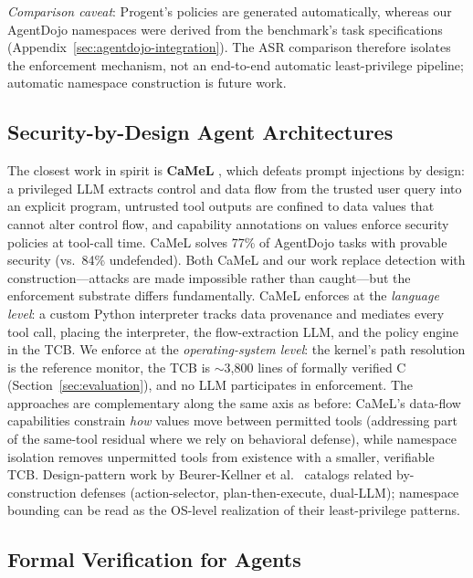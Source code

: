 \documentclass[acmsmall,screen,review]{acmart}
\begin{document}
\textit{Comparison caveat}: Progent's policies are generated automatically, whereas our AgentDojo namespaces were derived from the benchmark's task specifications (Appendix~\ref{sec:agentdojo-integration}). The ASR comparison therefore isolates the enforcement mechanism, not an end-to-end automatic least-privilege pipeline; automatic namespace construction is future work.

\subsection{Security-by-Design Agent Architectures}

The closest work in spirit is \textbf{CaMeL} \cite{debenedetti2025camel}, which defeats prompt injections by design: a privileged LLM extracts control and data flow from the trusted user query into an explicit program, untrusted tool outputs are confined to data values that cannot alter control flow, and capability annotations on values enforce security policies at tool-call time. CaMeL solves 77\% of AgentDojo tasks with provable security (vs.\ 84\% undefended). Both CaMeL and our work replace detection with construction---attacks are made impossible rather than caught---but the enforcement substrate differs fundamentally. CaMeL enforces at the \textit{language level}: a custom Python interpreter tracks data provenance and mediates every tool call, placing the interpreter, the flow-extraction LLM, and the policy engine in the TCB. We enforce at the \textit{operating-system level}: the kernel's path resolution is the reference monitor, the TCB is $\sim$3,800 lines of formally verified C (Section~\ref{sec:evaluation}), and no LLM participates in enforcement. The approaches are complementary along the same axis as before: CaMeL's data-flow capabilities constrain \textit{how} values move between permitted tools (addressing part of the same-tool residual where we rely on behavioral defense), while namespace isolation removes unpermitted tools from existence with a smaller, verifiable TCB. Design-pattern work by Beurer-Kellner et al.\ \cite{beurerkellner2025patterns} catalogs related by-construction defenses (action-selector, plan-then-execute, dual-LLM); namespace bounding can be read as the OS-level realization of their least-privilege patterns.

\subsection{Formal Verification for Agents}
\end{document}

